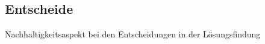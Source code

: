 \documentclass[../../main.tex]{subfiles} %
\begin{document}

\subsection{Entscheide}

Nachhaltigkeitsaspekt bei den Entscheidungen in der Lösungsfindung
\end{document}
